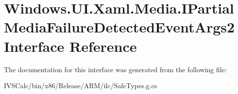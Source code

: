 \hypertarget{interface_windows_1_1_u_i_1_1_xaml_1_1_media_1_1_i_partial_media_failure_detected_event_args2}{}\section{Windows.\+U\+I.\+Xaml.\+Media.\+I\+Partial\+Media\+Failure\+Detected\+Event\+Args2 Interface Reference}
\label{interface_windows_1_1_u_i_1_1_xaml_1_1_media_1_1_i_partial_media_failure_detected_event_args2}


The documentation for this interface was generated from the following file\+:\begin{DoxyCompactItemize}
\item 
I\+V\+S\+Calc/bin/x86/\+Release/\+A\+R\+M/ilc/Safe\+Types.\+g.\+cs\end{DoxyCompactItemize}

